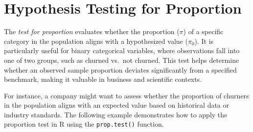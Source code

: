 \documentclass[
]{book}
\newcommand{\passthrough}[1]{#1}
\theoremstyle{definition}
\theoremstyle{definition}
\theoremstyle{definition}
\theoremstyle{definition}
\theoremstyle{remark}
\begin{document}
\section{Hypothesis Testing for Proportion}\label{hypothesis-testing-for-proportion}

The \emph{test for proportion} evaluates whether the proportion (\(\pi\)) of a specific category in the population aligns with a hypothesized value (\(\pi_0\)). It is particularly useful for binary categorical variables, where observations fall into one of two groups, such as churned vs.~not churned. This test helps determine whether an observed sample proportion deviates significantly from a specified benchmark, making it valuable in business and scientific contexts.

For instance, a company might want to assess whether the proportion of churners in the population aligns with an expected value based on historical data or industry standards. The following example demonstrates how to apply the proportion test in R using the \passthrough{\lstinline!prop.test()!} function.
\end{document}
